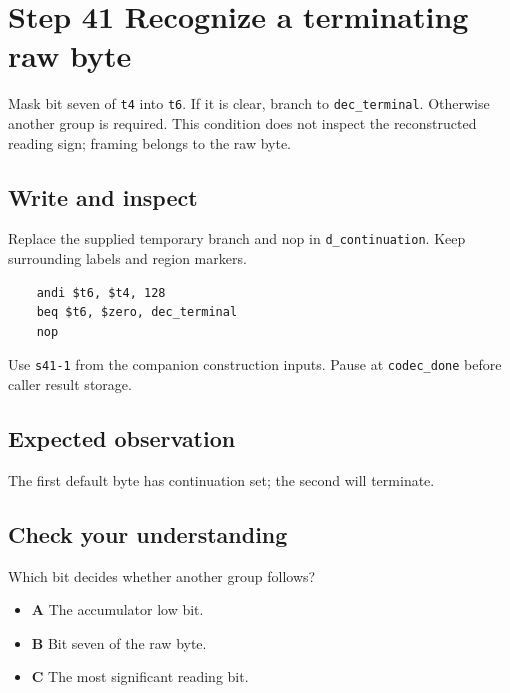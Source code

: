 \section{Step 41 Recognize a terminating raw byte}\label{delta-s41}

Mask bit seven of \texttt{t4} into \texttt{t6}. If it is clear, branch to \texttt{dec\_terminal}. Otherwise another group is required. This condition does not inspect the reconstructed reading sign; framing belongs to the raw byte.

\subsection{Write and inspect}
Replace the supplied temporary branch and nop in \texttt{d\_continuation}. Keep surrounding labels and region markers.

\begin{verbatim}
    andi $t6, $t4, 128
    beq $t6, $zero, dec_terminal
    nop
\end{verbatim}
Use \texttt{s41-1} from the companion construction inputs. Pause at \texttt{codec\_done} before caller result storage.

\subsection{Expected observation}
The first default byte has continuation set; the second will terminate.

\subsection{Check your understanding}
Which bit decides whether another group follows?

\begin{itemize}
  \item \textbf{A} The accumulator low bit.
  \item \textbf{B} Bit seven of the raw byte.
  \item \textbf{C} The most significant reading bit.
\end{itemize}
